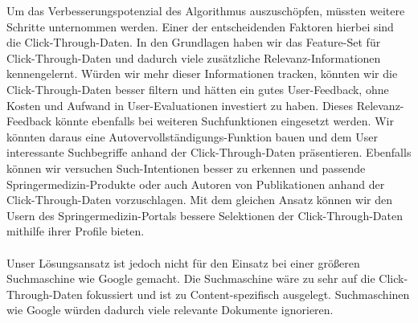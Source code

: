 Um das Verbesserungspotenzial des Algorithmus auszuschöpfen, müssten weitere Schritte unternommen werden. Einer der entscheidenden Faktoren hierbei sind die Click-Through-Daten. In den Grundlagen haben wir das Feature-Set für Click-Through-Daten und dadurch viele zusätzliche Relevanz-Informationen kennengelernt. Würden wir mehr dieser Informationen tracken, könnten wir die Click-Through-Daten besser filtern und hätten ein gutes User-Feedback, ohne Kosten und Aufwand in User-Evaluationen investiert zu haben. Dieses Relevanz-Feedback könnte ebenfalls bei weiteren Suchfunktionen eingesetzt werden. Wir könnten daraus eine Autovervollständigungs-Funktion bauen und dem User interessante Suchbegriffe anhand der Click-Through-Daten präsentieren. Ebenfalls können wir versuchen Such-Intentionen besser zu erkennen und passende Springermedizin-Produkte oder auch Autoren von Publikationen anhand der Click-Through-Daten vorzuschlagen. Mit dem gleichen Ansatz können wir den Usern des Springermedizin-Portals bessere Selektionen der Click-Through-Daten mithilfe ihrer Profile bieten.
\\
\\
Unser Lösungsansatz ist jedoch nicht für den Einsatz bei einer größeren Suchmaschine wie Google gemacht. Die Suchmaschine wäre zu sehr auf die Click-Through-Daten fokussiert und ist zu Content-spezifisch ausgelegt. Suchmaschinen wie Google würden dadurch viele relevante Dokumente ignorieren.